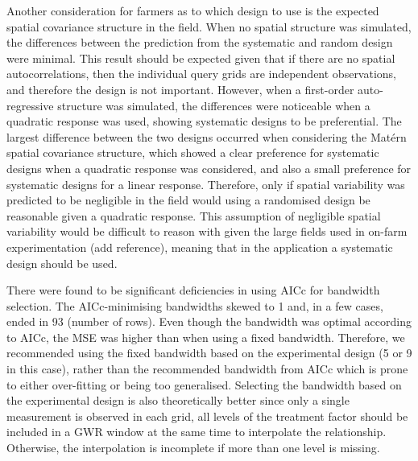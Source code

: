 \documentclass[a4paper]{article} 	%
\newcommand{\Matern}{Mat\'ern }
\begin{document}
Another consideration for farmers as to which design to use is the expected spatial covariance structure in the field. When no spatial structure was simulated, the differences between the prediction from the systematic and random design were minimal. This result should be expected given that if there are no spatial autocorrelations, then the individual query grids are independent observations, and therefore the design is not important. However, when a first-order auto-regressive structure was simulated, the differences were noticeable when a quadratic response was used, showing systematic designs to be preferential. The largest difference between the two designs occurred when considering the \Matern spatial covariance structure, which showed a clear preference for systematic designs when a quadratic response was considered, and also a small preference for systematic designs for a linear response. Therefore, only if spatial variability was predicted to be negligible in the field would using a randomised design be reasonable given a quadratic response. This assumption of negligible spatial variability would be difficult to reason with given the large fields used in on-farm experimentation (add reference), meaning that in the application a systematic design should be used. 


There were found to be significant deficiencies in using AICc for bandwidth selection. The AICc-minimising bandwidths skewed to 1 and, in a few cases, ended in 93 (number of rows). Even though the bandwidth was optimal according to AICc, the MSE was higher than when using a fixed bandwidth. Therefore, we recommended using the fixed bandwidth based on the experimental design (5 or 9 in this case), rather than the recommended bandwidth from AICc which is prone to either over-fitting or being too generalised. Selecting the bandwidth based on the experimental design is also theoretically better since only a single measurement is observed in each grid, all levels of the treatment factor should be included in a GWR window at the same time to interpolate the %
relationship. Otherwise, the interpolation is incomplete if more than one level is missing. 
\end{document}
